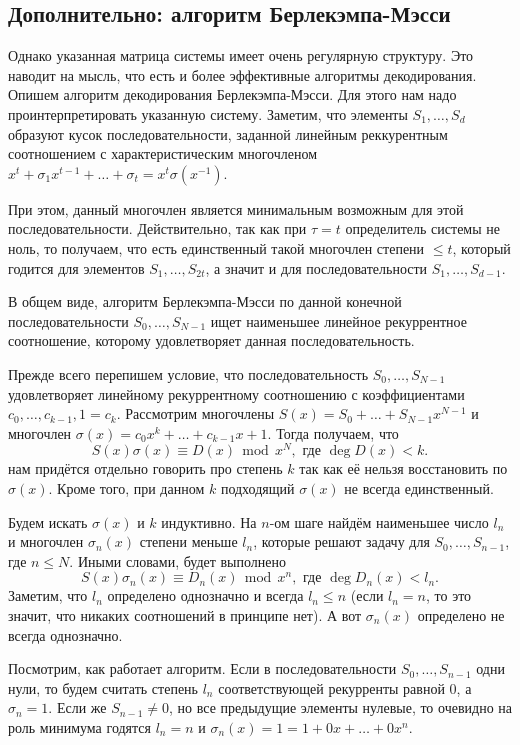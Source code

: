 \documentclass[12pt,a4paper,oneside]{book}
\theoremstyle{definition}
\renewcommand{\leq}{\leqslant}
\renewcommand{\mod}{\,\operatorname{mod}\,}
\begin{document}
\subsection{Дополнительно: алгоритм Берлекэмпа-Мэсси}
Однако указанная матрица системы имеет очень регулярную структуру. Это наводит на мысль, что есть и более эффективные алгоритмы декодирования. Опишем алгоритм декодирования Берлекэмпа-Мэсси. Для этого нам надо проинтерпретировать указанную систему. Заметим, что элементы $S_1,\dots,S_d$ образуют кусок последовательности, заданной линейным реккурентным соотношением с характеристическим многочленом $x^t+\sigma_1x^{t-1}+\dots + \sigma_t= x^t \sigma(x^{-1})$.

При этом, данный многочлен является минимальным возможным для этой последовательности. Действительно, так как при $\tau =t$ определитель системы не ноль, то получаем, что есть единственный такой многочлен степени $\leq t$, который годится для элементов $S_1,\dots,S_{2t}$, а значит и для последовательности $S_1,\dots,S_{d-1}$. 

В общем виде, алгоритм Берлекэмпа-Мэсси по данной конечной последовательности $S_0,\dots, S_{N-1}$ ищет наименьшее линейное рекуррентное соотношение, которому удовлетворяет данная последовательность. 

Прежде всего перепишем условие, что последовательность $S_0,\dots, S_{N-1}$ удовлетворяет линейному рекуррентному соотношению  с коэффициентами $c_0,\dots, c_{k-1}, 1=c_k$. Рассмотрим многочлены $S(x)=S_0+\dots+S_{N-1}x^{N-1}$ и многочлен $\sigma(x)=c_0x^k+\dots + c_{k-1}x+1$. Тогда получаем, что 
$$S(x)\sigma(x)\equiv D(x) \mod x^N, \text{ где } \deg D(x) < k.$$
нам придётся отдельно говорить про степень $k$ так как её нельзя восстановить по $\sigma(x)$. Кроме того, при данном $k$ подходящий  $\sigma(x)$ не всегда единственный.


Будем искать $\sigma(x)$ и $k$ индуктивно. На $n$-ом шаге найдём наименьшее число $l_n$ и многочлен $\sigma_n(x)$ степени меньше $l_n$, которые решают задачу для $S_0,\dots, S_{n-1}$, где $n\leq N$. Иными словами, будет выполнено 
$$ S(x)\sigma_n(x) \equiv D_n(x) \mod x^n, \text{ где } \deg D_n(x) < l_n.$$
Заметим, что $l_n$ определено однозначно и всегда $l_n\leq n$ (если $l_n=n$, то это значит, что никаких соотношений в принципе нет). А  вот $\sigma_n(x)$ определено не всегда однозначно.



Посмотрим, как работает алгоритм. Если в последовательности $S_0,\dots,S_{n-1}$ одни нули, то будем считать степень $l_n$ соответствующей рекурренты равной $0$, а $\sigma_n=1$. Если же $S_{n-1}\neq 0$, но все предыдущие элементы нулевые, то очевидно на роль минимума годятся $l_n=n$ и $\sigma_n(x)=1= 1+0x+\dots+0x^n$.
\end{document}
